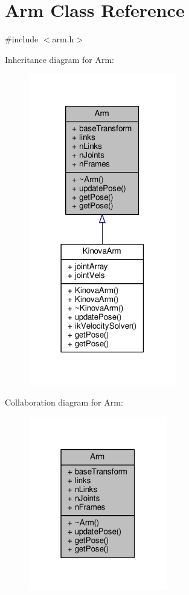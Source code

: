 \hypertarget{class_arm}{}\section{Arm Class Reference}
\label{class_arm}


{\ttfamily \#include $<$arm.\+h$>$}



Inheritance diagram for Arm\+:
\nopagebreak
\begin{figure}[H]
\begin{center}
\leavevmode
\includegraphics[width=182pt]{class_arm__inherit__graph}
\end{center}
\end{figure}


Collaboration diagram for Arm\+:
\nopagebreak
\begin{figure}[H]
\begin{center}
\leavevmode
\includegraphics[width=171pt]{class_arm__coll__graph}
\end{center}
\end{figure}
